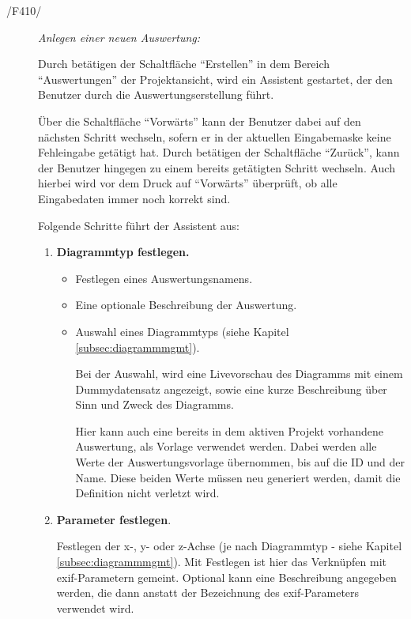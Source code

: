 	\begin{description}
		
		\item[/F410/] \textit{Anlegen einer neuen Auswertung:}\par Durch betätigen der Schaltfläche "`Erstellen"' in dem Bereich "`Auswertungen"' der Projektansicht, wird ein Assistent gestartet, der den Benutzer durch die Auswertungserstellung führt.\par Über die Schaltfläche "`Vorwärts"' kann der Benutzer dabei auf den nächsten Schritt wechseln, sofern er in der aktuellen Eingabemaske keine Fehleingabe getätigt hat. Durch betätigen der Schaltfläche "`Zurück"', kann der Benutzer hingegen zu einem bereits getätigten Schritt wechseln. Auch hierbei wird vor dem Druck auf "`Vorwärts"' überprüft, ob alle Eingabedaten immer noch korrekt sind.\par Folgende Schritte führt der Assistent aus:

			\begin{enumerate}

				\item \textbf{Diagrammtyp festlegen.}

					\begin{itemize}

						\item Festlegen eines Auswertungsnamens.

						\item Eine optionale Beschreibung der Auswertung.

						\item Auswahl eines Diagrammtyps (siehe Kapitel \ref{subsec:diagrammmgmt}).\par Bei der Auswahl, wird eine Livevorschau des Diagramms mit einem Dummydatensatz angezeigt, sowie eine kurze Beschreibung über Sinn und Zweck des Diagramms.\par Hier kann auch eine bereits in dem aktiven Projekt vorhandene Auswertung, als Vorlage verwendet werden. Dabei werden alle Werte der Auswertungsvorlage übernommen, bis auf die ID und der Name. Diese beiden Werte müssen neu generiert werden, damit die Definition nicht verletzt wird.

					\end{itemize}

				\item \textbf{Parameter festlegen}.\par Festlegen der x-, y- oder z-Achse (je nach Diagrammtyp - siehe Kapitel \ref{subsec:diagrammmgmt}). Mit Festlegen ist hier das Verknüpfen mit \gls{exif}-Parametern gemeint. Optional kann eine Beschreibung angegeben werden, die dann anstatt der Bezeichnung des \gls{exif}-Parameters verwendet wird.


\end{enumerate}
\end{description}
